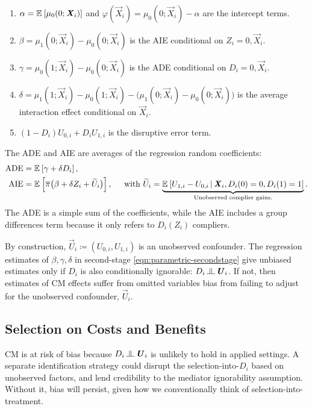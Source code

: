 \begin{enumerate}[label=\textbf{(\alph*)}]
    \item $\alpha = \mathbb{E}_{} \left[ \mu_0(0; \boldsymbol{\mathit{X}}_i) \right]$ and $\varphi(\vec X_i) = \mu_0(0; \vec X_i) - \alpha$ are the intercept terms.
    \item $\beta = \mu_1(0; \vec X_i) - \mu_0(0; \vec X_i)$ is the AIE conditional on $Z_i = 0, \vec X_i$.
    \item $\gamma = \mu_0(1; \vec X_i) - \mu_0(0; \vec X_i)$ is the ADE conditional on $D_i = 0, \vec X_i$.
    \item $\delta = \mu_1(1; \vec X_i) - \mu_0(1; \vec X_i) - \big( \mu_1(0; \vec X_i) - \mu_0(0; \vec X_i) \big)$ is the average interaction effect conditional on $\vec X_i$.
    \item $\left( 1 - D_i \right) U_{0,i} + D_i U_{1,i}$ is the disruptive error term.
\end{enumerate}

The ADE and AIE are averages of the regression random coefficients:
\begin{align*}
    \text{ADE}
        &= \mathbb{E}_{} \left[ \gamma + \delta D_i \right], \\
    \text{AIE}
        &= \mathbb{E}_{} \left[  \overline{\pi} \big( \beta +  \delta Z_i + \widetilde{U}_i \big) \right],
        \;\;\;\; \text{ with } \widetilde{U}_i
            = \underbrace{\mathbb{E}_{} \left[  U_{1,i} - U_{0,i} \, \middle\vert \, 
                \boldsymbol{\mathit{X}}_i, D_i(0) = 0, D_i(1) = 1 \right]}_{
                    \text{Unobserved complier gains.}}.
\end{align*}
The ADE is a simple sum of the coefficients, while the AIE includes a group differences term because it only refers to $D_i(Z_i)$ compliers.

By construction, $\vec U_i \coloneqq \left(U_{0, i}, U_{1, i} \right)$ is an unobserved confounder.
The regression estimates of $\beta, \gamma, \delta$ in second-stage \eqref{eqn:parametric-secondstage} give unbiased estimates only if $D_i$ is also conditionally ignorable: $D_i \indep  \vec U_{i} $.
If not, then estimates of CM effects suffer from omitted variables bias from failing to adjust for the unobserved confounder, $\vec U_i$.

\subsection{Selection on Costs and Benefits}
CM is at risk of bias because $D_i \indep  \vec U_i$ %
is unlikely to hold in applied settings.
A separate identification strategy could disrupt the selection-into-$D_i$ based on unobserved factors, and lend credibility to the mediator ignorability assumption.
Without it, bias will persist, given how we conventionally think of selection-into-treatment.


